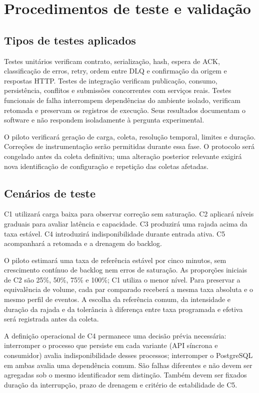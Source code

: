 \section{Procedimentos de teste e validação}

\subsection{Tipos de testes aplicados}
Testes unitários verificam contrato, serialização, hash, espera de ACK, classificação de erros, retry, ordem entre DLQ e confirmação da origem e respostas HTTP. Testes de integração verificam publicação, consumo, persistência, conflitos e submissões concorrentes com serviços reais. Testes funcionais de falha interrompem dependências do ambiente isolado, verificam retomada e preservam os registros de execução. Seus resultados documentam o software e não respondem isoladamente à pergunta experimental.

O piloto verificará geração de carga, coleta, resolução temporal, limites e duração. Correções de instrumentação serão permitidas durante essa fase. O protocolo será congelado antes da coleta definitiva; uma alteração posterior relevante exigirá nova identificação de configuração e repetição das coletas afetadas.

\subsection{Cenários de teste}
C1 utilizará carga baixa para observar correção sem saturação. C2 aplicará níveis graduais para avaliar latência e capacidade. C3 produzirá uma rajada acima da taxa estável. C4 introduzirá indisponibilidade durante entrada ativa. C5 acompanhará a retomada e a drenagem do backlog.

O piloto estimará uma taxa de referência estável por cinco minutos, sem crescimento contínuo de backlog nem erros de saturação. As proporções iniciais de C2 são 25\%, 50\%, 75\% e 100\%; C1 utiliza o menor nível. Para preservar a equivalência de volume, cada par comparado receberá a mesma taxa absoluta e o mesmo perfil de eventos. A escolha da referência comum, da intensidade e duração da rajada e da tolerância à diferença entre taxa programada e efetiva será registrada antes da coleta.

A definição operacional de C4 permanece uma decisão prévia necessária: interromper o processo que persiste em cada variante (API síncrona e consumidor) avalia indisponibilidade desses processos; interromper o PostgreSQL em ambas avalia uma dependência comum. São falhas diferentes e não devem ser agregadas sob o mesmo identificador sem distinção. Também devem ser fixados duração da interrupção, prazo de drenagem e critério de estabilidade de C5.

